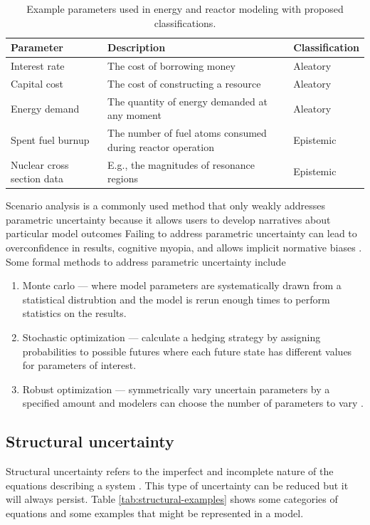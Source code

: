 \begin{table}[ht!]
    \centering
    \caption{Example parameters used in energy and reactor modeling with proposed classifications.}
    \label{tab:param-examples}
    \begin{tabular}{lll} 
        \toprule
        Parameter&Description&Classification\\
        \midrule
        Interest rate&The cost of borrowing money&Aleatory\\
        Capital cost&The cost of constructing a resource&Aleatory\\
        Energy demand&The quantity of energy demanded at any moment&Aleatory\\
        Spent fuel burnup&The number of fuel atoms consumed during reactor
        operation&Epistemic\\
        Nuclear cross section data& E.g., the magnitudes of resonance
        regions&Epistemic\\
        \bottomrule
    \end{tabular}
\end{table}

Scenario analysis is a commonly used method that only weakly addresses
parametric uncertainty because it allows users to develop narratives about
particular model outcomes \cite{decarolis_using_2011} Failing to address
parametric uncertainty can lead to overconfidence in results, cognitive myopia,
and allows implicit normative biases \cite{yue_review_2018}. Some formal methods
to address parametric uncertainty include \cite{yue_review_2018}
\begin{enumerate}
    \item Monte carlo --- where model parameters are systematically drawn from a
    statistical distrubtion and the model is rerun enough times to perform
    statistics on the results.
    \item Stochastic optimization --- calculate a hedging strategy by assigning
    probabilities to possible futures where each future state has different
    values for parameters of interest.
    \item Robust optimization --- symmetrically vary uncertain parameters by a
    specified amount and modelers can choose the number of parameters to vary
    \cite{bertsimas_theory_2011,yue_review_2018}.
\end{enumerate}

\subsection{Structural uncertainty}
Structural uncertainty refers to the imperfect and incomplete nature of the
equations describing a system \cite{decarolis_using_2011}. This type of
uncertainty can be reduced but it will always persist. Table
\ref{tab:structural-examples} shows some categories of equations and some
examples that might be represented in a model.

